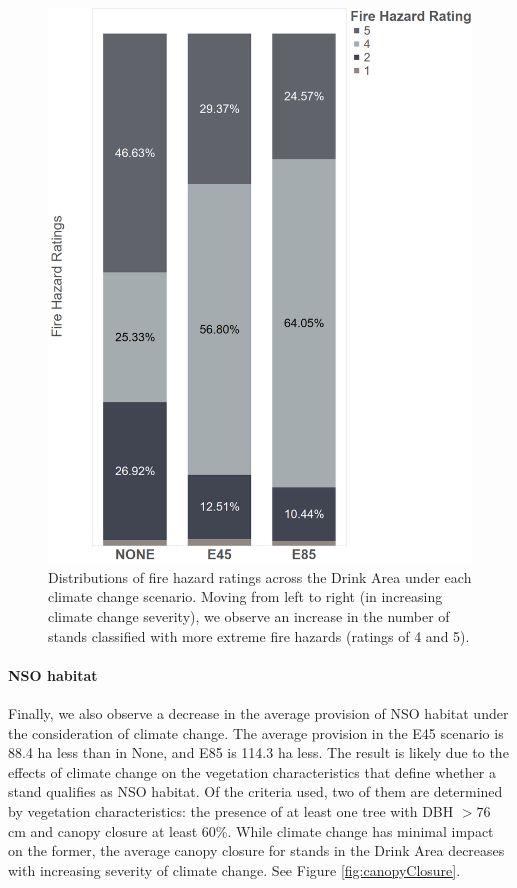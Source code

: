 \begin{figure}[ht]
\centering
\includegraphics[width=.5\textwidth]{../images/FireHazardRatingsPerClimateScenario}
\caption[Distribution of fire hazard ratings over the Drink Area for each climate change scenario]{Distributions of fire hazard ratings across the Drink Area under each climate change scenario. Moving from left to right (in increasing climate change severity), we observe an increase in the number of stands classified with more extreme fire hazards (ratings of 4 and 5).}
\label{fig:cumSmallestFireHazard}
\end{figure}

\paragraph{NSO habitat}
Finally, we also observe a decrease in the average provision of NSO habitat under the consideration of climate change. The average provision in the E45 scenario is 88.4 ha less than in None, and E85 is 114.3 ha less. The result is likely due to the effects of climate change on the vegetation characteristics that define whether a stand qualifies as NSO habitat. Of the criteria used, two of them are determined by vegetation characteristics: the presence of at least one tree with DBH $> 76$ cm and canopy closure at least 60\%. While climate change has minimal impact on the former, the average canopy closure for stands in the Drink Area decreases with increasing severity of climate change. See Figure \ref{fig:canopyClosure}.

